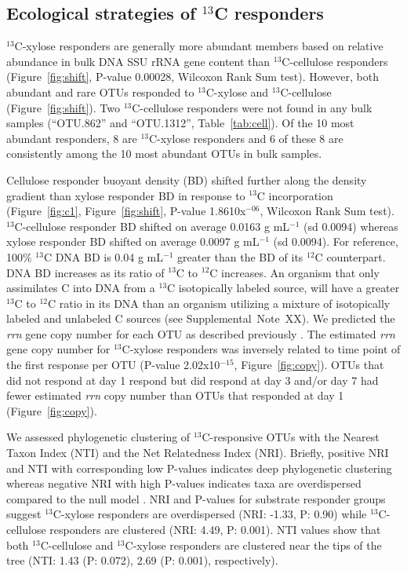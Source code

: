 \subsection{Ecological strategies of $^{13}$C responders}
$^{13}$C-xylose responders are generally more abundant members based on
relative abundance in bulk DNA SSU rRNA gene content than $^{13}$C-cellulose
responders (Figure~\ref{fig:shift}, P-value 0.00028, Wilcoxon Rank Sum test).
However, both abundant and rare OTUs responded to $^{13}$C-xylose and
$^{13}$C-cellulose (Figure~\ref{fig:shift}). Two $^{13}$C-cellulose responders
were not found in any bulk samples (``OTU.862'' and ``OTU.1312'',
Table~\ref{tab:cell}). Of the 10 most abundant responders, 8 are
$^{13}$C-xylose responders and 6 of these 8 are consistently among the 10 most
abundant OTUs in bulk samples.

Cellulose responder buoyant density (BD) shifted further along the density
gradient than xylose responder BD in response to $^{13}$C incorporation
(Figure~\ref{fig:c1}, Figure~\ref{fig:shift}, P-value 1.8610x$^{-06}$, Wilcoxon
Rank Sum test). $^{13}$C-cellulose responder BD shifted on average
0.0163 g mL$^{-1}$ (sd 0.0094) whereas xylose responder BD shifted on average
0.0097 g mL$^{-1}$ (sd 0.0094). For reference, 100\% $^{13}$C DNA BD is 0.04
g mL$^{-1}$ greater than the BD of its $^{12}$C counterpart. DNA BD increases
as its ratio of $^{13}$C to $^{12}$C increases. An organism that only
assimilates C into DNA from a $^{13}$C isotopically labeled source, will have
a greater $^{13}$C to $^{12}$C ratio in its DNA than an organism utilizing
a mixture of isotopically labeled and unlabeled C sources (see
Supplemental~Note~XX). We predicted the \textit{rrn} gene copy number for each
OTU as described previously \citep{Kembel_2012}. The estimated
\textit{rrn} gene copy number for $^{13}$C-xylose responders was inversely
related to time point of the first response per OTU (P-value
2.02x10$^{-15}$, Figure~\ref{fig:copy}). OTUs that did not respond at day
1 respond but did respond at day 3 and/or day 7 had fewer estimated
\textit{rrn} copy number than OTUs that responded at day 1
(Figure~\ref{fig:copy}). 

We assessed phylogenetic clustering of $^{13}$C-responsive OTUs with the
Nearest Taxon Index (NTI) and the Net Relatedness Index (NRI). Briefly,
positive NRI and NTI with corresponding low P-values indicates deep
phylogenetic clustering whereas negative NRI with high P-values indicates taxa
are overdispersed compared to the null model \citep{Evans2014a}. NRI and
P-values for substrate responder groups suggest $^{13}$C-xylose responders are
overdispersed (NRI: -1.33, P: 0.90) while $^{13}$C-cellulose responders are
clustered (NRI: 4.49, P: 0.001). NTI values show that both $^{13}$C-cellulose
and $^{13}$C-xylose responders are clustered near the tips of the tree (NTI:
1.43 (P: 0.072), 2.69 (P: 0.001), respectively). 






